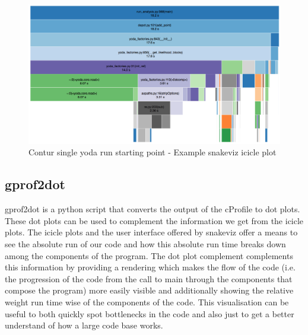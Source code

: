 \begin{figure}[H]
\centering
\includegraphics[scale=0.3]{plots/initial_single_contur.png}
\caption{Contur single yoda run starting point - Example snakeviz icicle plot}
\label{fig:single_yoda_start_profile_snakeviz}
\end{figure}

\subsection{gprof2dot}
gprof2dot is a python script that converts the output of the cProfile to dot plots. These dot plots can be used to complement the information we get from the icicle plots. The icicle plots and the user interface offered by snakeviz offer a means to see the absolute run of our code and how this absolute run time breaks down among the components of the program. The dot plot complement complements this information by providing a rendering which makes the flow of the code (i.e. the progression of the code from the call to main through the components that compose the program) more easily visible and additionally showing the relative weight run time wise of the components of the code. This visualisation can be useful to both quickly spot bottlenecks in the code and also just to get a better understand of how a large code base works.

